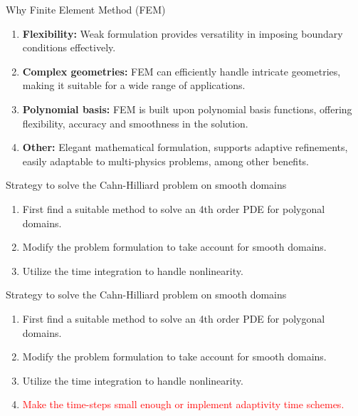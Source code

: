 \begin{frame}
    \begin{block}{Why Finite Element Method (FEM)}
        \begin{enumerate}
            \item \textbf{Flexibility:} Weak formulation provides versatility in imposing boundary conditions effectively.
            \item \textbf{Complex geometries:} FEM can efficiently handle intricate geometries, making it suitable for a wide range of applications.
            \item \textbf{Polynomial basis:} FEM is built upon polynomial basis functions, offering flexibility, accuracy and smoothness in the solution.
            \item \textbf{Other: } Elegant mathematical formulation, supports adaptive refinements, easily adaptable to multi-physics problems, among other benefits.
        \end{enumerate}
    \end{block}
\end{frame}

\begin{frame}
    \begin{block}{Strategy to solve the Cahn-Hilliard problem on smooth domains}
        \begin{enumerate}
            \item First find a suitable method to solve an 4th order PDE for polygonal domains.
            \item Modify the problem formulation to take account for smooth domains.
            \item Utilize the time integration to handle nonlinearity.
        \end{enumerate}
    \end{block}
\end{frame}

\begin{frame}
    \begin{block}{Strategy to solve the Cahn-Hilliard problem on smooth domains}
        \begin{enumerate}
            \item First find a suitable method to solve an 4th order PDE for polygonal domains.
            \item Modify the problem formulation to take account for smooth domains.
            \item Utilize the time integration to handle nonlinearity.
\item \textcolor{red}{Make the time-steps small enough or implement adaptivity time schemes.}
        \end{enumerate}
    \end{block}
\end{frame}


